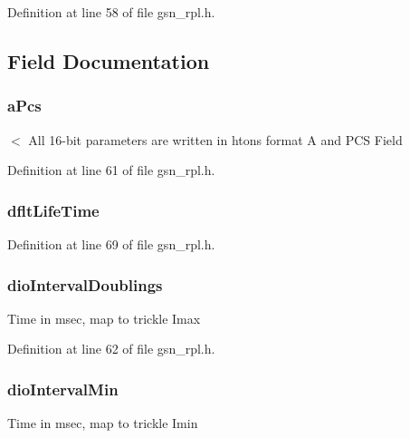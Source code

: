 Definition at line 58 of file gsn\_\-rpl.h.



\subsection{Field Documentation}
\hypertarget{a00199_a8acbffdadb276f36b98214855b068571}{
\subsubsection[{aPcs}]{ {\bf aPcs}}}
\label{a00199_a8acbffdadb276f36b98214855b068571}
$<$ All 16-\/bit parameters are written in htons format A and PCS Field 

Definition at line 61 of file gsn\_\-rpl.h.

\hypertarget{a00199_acb36a21fb713f299825d49feff9cc5f2}{
\subsubsection[{dfltLifeTime}]{ {\bf dfltLifeTime}}}
\label{a00199_acb36a21fb713f299825d49feff9cc5f2}


Definition at line 69 of file gsn\_\-rpl.h.

\hypertarget{a00199_ac65bb01c09c66d99aec44e7db7489dd7}{
\subsubsection[{dioIntervalDoublings}]{ {\bf dioIntervalDoublings}}}
\label{a00199_ac65bb01c09c66d99aec44e7db7489dd7}
Time in msec, map to trickle Imax 

Definition at line 62 of file gsn\_\-rpl.h.

\hypertarget{a00199_ab41be0408af5baf26f8aab116cf12768}{
\subsubsection[{dioIntervalMin}]{ {\bf dioIntervalMin}}}
\label{a00199_ab41be0408af5baf26f8aab116cf12768}
Time in msec, map to trickle Imin 


